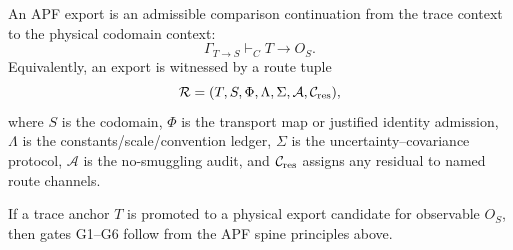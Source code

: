 \begin{definition}
An APF export is an admissible comparison continuation from the trace context to the physical codomain context:
\[
        \Gamma_{T\to S}\vdash_C T\to O_S.
\]
Equivalently, an export is witnessed by a route tuple
\[
        \mathcal R=(T,S,\Phi,\Lambda,\Sigma,\mathcal A,\mathcal C_{\rm res}),
\]
where $S$ is the codomain, $\Phi$ is the transport map or justified identity admission, $\Lambda$ is the constants/scale/convention ledger, $\Sigma$ is the uncertainty--covariance protocol, $\mathcal A$ is the no-smuggling audit, and $\mathcal C_{\rm res}$ assigns any residual to named route channels.
\end{definition}

\begin{theorem}
\label{thm:gates-derived-from-apf}
If a trace anchor $T$ is promoted to a physical export candidate for observable $O_S$, then gates G1--G6 follow from the APF spine principles above.
\end{theorem}

